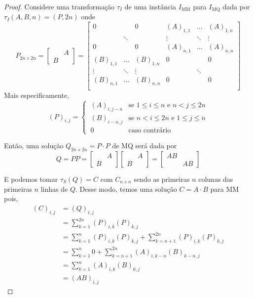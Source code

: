 \begin{proof}
    Considere uma transformação $\tau_I$ de uma instância $I_\text{MM}$ para $I_\text{MQ}$ dada por $\tau_I(A, B, n) = (P, 2n)$ onde
    \[
        P_{2n \times 2n} = \begin{bmatrix} & A \\ B & \end{bmatrix}
        = \begin{bmatrix}
            0         &        & 0         & (A)_{1,1} & \dots  & (A)_{1,n} \\
                      & \ddots &           & \vdots    & \ddots & \vdots    \\
            0         &        & 0         & (A)_{n,1} & \dots  & (A)_{n,n} \\
            (B)_{1,1} & \dots  & (B)_{1,n} & 0         &        & 0         \\
            \vdots    & \ddots & \vdots    &           & \ddots &           \\
            (B)_{n,1} & \dots  & (B)_{n,n} & 0         &        & 0         \\
        \end{bmatrix}
    \]
    Mais especificamente,
    \[
        (P)_{i,j} = \begin{cases}
            ~ (A)_{i,j-n} & \text{se $1 \leq i \leq n$ e $n < j \leq 2 n$} \\
            ~ (B)_{i-n,j} & \text{se $n < i \leq 2 n$ e $1 \leq j \leq n$}\\
            ~ 0 & \text{caso contrário}
        \end{cases}
    \]

    Então, uma solução $Q_{2n \times 2n} = P \cdot P$ de MQ será dada por
    \[
        Q = P P
        = \begin{bmatrix} & A \\ B & \end{bmatrix} \begin{bmatrix} & A \\ B & \end{bmatrix}
        = \begin{bmatrix} A B & \\ & A B \end{bmatrix}
    \]

    E podemos tomar $\tau_S(Q) = C$ com $C_{n \times n}$ sendo as primeiras $n$ colunas das primeiras $n$ linhas de $Q$. Desse modo, temos uma solução $C = A \cdot B$ para MM pois,
    \begin{align*}
        (C)_{i,j} &= (Q)_{i,j} \\
            &= \sum_{k = 1}^{2n} (P)_{i,k} (P)_{k,j} \\
            &= \sum_{k = 1}^{n} (P)_{i,k} (P)_{k,j} + \sum_{k = n + 1}^{2n} (P)_{i,k} (P)_{k,j} \\
            &= \sum_{k = 1}^{n} 0 + \sum_{k = n + 1}^{2 n} (A)_{i,k-n} (B)_{k-n,j} \\
            &= \sum_{k = 1}^{n} (A)_{i,k} (B)_{k,j} \\
            &= (A B)_{i,j}
    \end{align*}


\end{proof}
